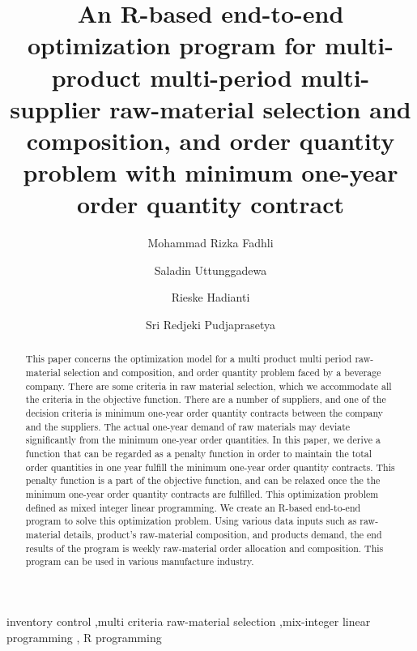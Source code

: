 \documentclass[preprint, 3p,
authoryear]{elsarticle} %
\begin{document}
\begin{frontmatter}

  \title{An R-based end-to-end optimization program for multi-product
multi-period multi-supplier raw-material selection and composition, and
order quantity problem with minimum one-year order quantity contract}
    \author[lala]{Mohammad Rizka Fadhli%
  }
    \author[lili]{Saladin Uttunggadewa%
  }
  
    \author[lulu]{Rieske Hadianti%
  }
  
    \author[lili]{Sri Redjeki Pudjaprasetya%
  }
  
  
  \begin{abstract}
  This paper concerns the optimization model for a multi product multi
  period raw-material selection and composition, and order quantity
  problem faced by a beverage company. There are some criteria in raw
  material selection, which we accommodate all the criteria in the
  objective function. There are a number of suppliers, and one of the
  decision criteria is minimum one-year order quantity contracts between
  the company and the suppliers. The actual one-year demand of raw
  materials may deviate significantly from the minimum one-year order
  quantities. In this paper, we derive a function that can be regarded
  as a penalty function in order to maintain the total order quantities
  in one year fulfill the minimum one-year order quantity contracts.
  This penalty function is a part of the objective function, and can be
  relaxed once the the minimum one-year order quantity contracts are
  fulfilled. This optimization problem defined as mixed integer linear
  programming. We create an R-based end-to-end program to solve this
  optimization problem. Using various data inputs such as raw-material
  details, product's raw-material composition, and products demand, the
  end results of the program is weekly raw-material order allocation and
  composition. This program can be used in various manufacture industry.
  \end{abstract}
    \begin{keyword}
    inventory control \sep multi criteria raw-material
selection \sep mix-integer linear programming \sep 
    R programming
  \end{keyword}
  
 \end{frontmatter}
\end{document}
